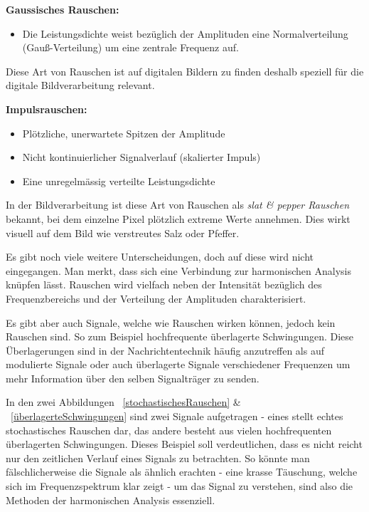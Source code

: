 \begin{definition}{\bf Gaussisches Rauschen:}
	\begin{itemize}
		\item Die Leistungsdichte weist bezüglich der Amplituden eine Normalverteilung (Gauß-Verteilung) um eine zentrale Frequenz auf.
	\end{itemize}
	Diese Art von Rauschen ist auf digitalen Bildern zu finden deshalb speziell für die digitale Bildverarbeitung relevant. 
\end{definition}

\begin{definition}{\bf Impulsrauschen:}
	\begin{itemize}
		\item Plötzliche, unerwartete Spitzen der Amplitude 
		\item Nicht kontinuierlicher Signalverlauf (skalierter Impuls)
		\item Eine unregelmässig verteilte Leistungsdichte
	\end{itemize}
	In der Bildverarbeitung ist diese Art von Rauschen als \textit{slat \& pepper Rauschen} bekannt, bei dem einzelne Pixel plötzlich extreme Werte annehmen. Dies wirkt visuell auf dem Bild wie verstreutes Salz oder Pfeffer.
\end{definition}

Es gibt noch viele weitere Unterscheidungen, doch auf diese wird nicht eingegangen. Man merkt, dass sich eine Verbindung zur harmonischen Analysis knüpfen lässt. Rauschen wird vielfach neben der Intensität bezüglich des Frequenzbereichs und der Verteilung der Amplituden charakterisiert.


Es gibt aber auch Signale, welche wie Rauschen wirken können, jedoch kein Rauschen sind. So zum Beispiel hochfrequente überlagerte Schwingungen. Diese Überlagerungen sind in der Nachrichtentechnik häufig anzutreffen als auf modulierte Signale oder auch überlagerte Signale verschiedener Frequenzen um mehr Information über den selben Signalträger zu senden.


In den zwei Abbildungen ~\ref{stochastischesRauschen} \& ~\ref{überlagerteSchwingungen} sind zwei Signale aufgetragen - eines stellt echtes stochastisches Rauschen dar, das andere besteht aus vielen hochfrequenten überlagerten Schwingungen. Dieses Beispiel soll verdeutlichen, dass es nicht reicht nur den zeitlichen Verlauf eines Signals zu betrachten. So könnte man fälschlicherweise die Signale als ähnlich erachten - eine krasse Täuschung, welche sich im Frequenzspektrum klar zeigt - um das Signal zu verstehen, sind also die Methoden  der harmonischen Analysis essenziell. 

